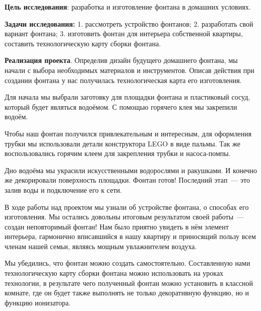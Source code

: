 


\makeProcTitleSchool


\textbf{Цель исследования}: разработка и изготовление фонтана в домашних условиях.

\textbf{Задачи исследования:} 1. рассмотреть устройство фонтанов; 2. разработать свой вариант фонтана; 3. изготовить фонтан для интерьера собственной квартиры, составить технологическую карту сборки фонтана.

\textbf{Реализация проекта}. Определив дизайн будущего домашнего фонтана, мы начали с выбора необходимых материалов и инструментов. Описав действия при создании фонтана у нас получилась технологическая карта его изготовления.

Для начала мы выбрали заготовку для площадки фонтана и пластиковый сосуд, который будет являться водоёмом. С помощью горячего клея мы закрепили водоём.

Чтобы наш фонтан получился привлекательным и интересным, для оформления трубки мы использовали детали конструктора LEGO в виде пальмы. Так же воспользовались горячим клеем для закрепления трубки и насоса-помпы.

Дно водоёма мы украсили искусственными водорослями и ракушками. И конечно же декорировали поверхность площадки.
Фонтан готов! Последний этап~--- это залив воды и подключение его к сети.

В ходе работы над проектом мы узнали об устройстве фонтана, о способах его изготовления. Мы остались довольны итоговым результатом своей работы~--- создан неповторимый фонтан! Нам было приятно увидеть в нём элемент интерьера, гармонично вписавшийся в нашу квартиру и приносящий пользу всем членам нашей семьи, являясь мощным увлажнителем воздуха.

Мы убедились, что фонтан можно создать самостоятельно. Составленную нами технологическую карту сборки фонтана можно использовать на уроках технологии, в результате чего полученный фонтан можно установить в классной комнате, где он будет также выполнять не только декоративную функцию, но и функцию ионизатора.
